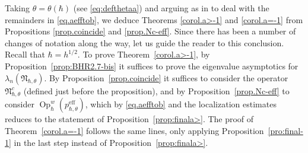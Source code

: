 \documentclass[JEP,XML,SOM,Unicode,NoFloatCountersInSection,published]{cedram}
\newcommand{\eff}{\mathrm{eff}}
\DeclareMathOperator{\Op}{Op}
\theoremstyle{plain}
\theoremstyle{definition}
\begin{document}
Taking $\theta=\theta(\hbar)$ (see \eqref{eq:defthetaa}) and arguing as in \cite[\S 8.3]{BLTRS21} to deal with the remainders in \eqref{eq.aefftob}, we deduce Theorems \ref{corol.a>-1} and \ref{corol.a=-1} from Propositions \ref{prop.coincide} and \ref{prop.Nc-eff}.
Since there has been a number of changes of notation along the way, let us guide the reader to this conclusion.
Recall that $\hbar=h^{1/2}$. To prove Theorem~\ref{corol.a>-1}, by Proposition~\ref{prop:BHR2.7-bis} it suffices to prove the eigenvalue asymptotics for $\lambda_n(\mathfrak N_{\hbar,\theta})$.
By Proposition~\ref{prop.coincide} it suffices to consider the operator $\mathfrak{N}^c_{\hbar,\theta}$ (defined just before the proposition), and by Proposition~\ref{prop.Nc-eff} to consider $\Op^w_\hbar (p^{\eff}_{\hbar,\theta})$, which by \eqref{eq.aefftob} and the localization estimates reduces to the statement of Proposition~\ref{prop:finala>}.
The proof of Theorem~\ref{corol.a=-1} follows the same lines, only applying Proposition~\ref{pro:final-1} in the last step instead of Proposition~\ref{prop:finala>}.

\backmatter


\end{document}
